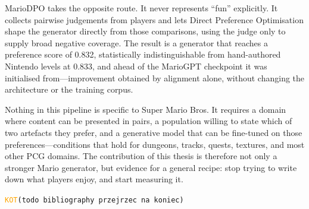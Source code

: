 \documentclass[shortabstract, mgr, english]{iithesis}
\newcommand{\DEBUG}[1]{{#1}} %
\newcommand{\KOT}[1]{\DEBUG{\tt{\textcolor{orange}{KOT}(}{#1}{)}}}
\begin{document}
MarioDPO takes the opposite route. It never represents ``fun''
explicitly. It collects pairwise judgements from players and lets Direct
Preference Optimisation shape the generator directly from those comparisons,
using the judge only to supply broad negative coverage. The result is a
generator that reaches a preference score of 0.832, statistically
indistinguishable from hand-authored Nintendo levels at 0.833, and ahead of the
MarioGPT checkpoint it was initialised from---improvement obtained by
alignment alone, without changing the architecture or the training corpus.

Nothing in this pipeline is specific to Super Mario Bros. It requires
a domain where content can be presented in pairs, a population willing to state
which of two artefacts they prefer, and a generative model that can be
fine-tuned on those preferences---conditions that hold for dungeons, tracks,
quests, textures, and most other PCG domains. The contribution of this thesis
is therefore not only a stronger Mario generator, but evidence for a general
recipe: stop trying to write down what players enjoy, and start measuring it.




\KOT{todo bibliography przejrzec na koniec}


\end{document}
